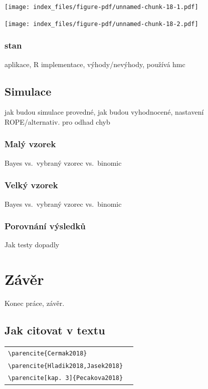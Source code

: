 \documentclass[
  11pt,
  a4paper]{report}
\begin{document}
\texttt{[image: index\_files/figure-pdf/unnamed-chunk-18-1.pdf]}

\texttt{[image: index\_files/figure-pdf/unnamed-chunk-18-2.pdf]}

\subsection{stan}\label{stan}

aplikace, R implementace, výhody/nevýhody, používá hmc

\section{Simulace}\label{simulace}

jak budou simulace provedné, jak budou vyhodnocené, nastavení
ROPE/alternativ. pro odhad chyb

\subsection{Malý vzorek}\label{maluxfd-vzorek}

Bayes vs.~vybraný vzorec vs.~binomic

\subsection{Velký vzorek}\label{velkuxfd-vzorek}

Bayes vs.~vybraný vzorec vs.~binomic

\subsection{Porovnání výsledků}\label{porovnuxe1nuxed-vuxfdsledkux16f}

Jak testy dopadly

{
\pagestyle{plain}
\chapter*{Závěr}

Konec práce, závěr.

\section{Jak citovat v textu}
\begin{center}
\begin{tabularx}{\textwidth}{l@{~~$\longrightarrow$~~}X}
\verb|\parencite{Cermak2018}|&\parencite{Cermak2018}\\
\verb|\parencite{Hladik2018,Jasek2018}|&\parencite{Hladik2018,Jasek2018}\\
\verb|\parencite[kap. 3]{Pecakova2018}|&\parencite[kap. 3]{Pecakova2018}\\
\end{tabularx}
\end{center}

}
\end{document}
